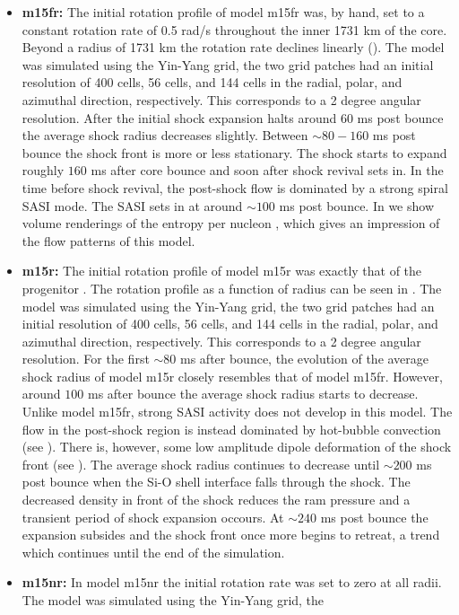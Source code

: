 \begin{itemize}
\item \textbf{m15fr:} The initial rotation profile of model m15fr was, by hand, set to a constant rotation rate of 0.5 rad/s
throughout the inner 1731 km of the core. Beyond a radius of 1731 km the rotation rate declines linearly (). 
The model was simulated using the 
Yin-Yang grid, the two grid patches had an initial resolution of 400 cells, 56 cells, and 144 cells in the radial, polar, and
azimuthal direction, respectively. This corresponds to a 2 degree angular resolution. 
After the initial shock expansion halts around $60$ ms post bounce the average shock radius decreases slightly.
Between $\sim 80 - 160$ ms post bounce the shock front is more or less stationary. 
The shock starts to expand roughly $160$ ms after core bounce and soon after shock revival sets in.
In the time before shock revival, the post-shock flow is dominated by a strong spiral SASI mode. The SASI sets in at around
$\sim 100$ ms post bounce. In we show volume renderings of the entropy per nucleon , which gives
an impression of the flow patterns of this model.
\item \textbf{m15r:} The initial rotation profile of model m15r was exactly that of the progenitor \citep{heger_05}.
The rotation profile as a function of radius can be seen in .  
The model was simulated using the Yin-Yang grid, the two grid patches had an initial resolution of 400 cells, 
56 cells, and 144 cells in the radial, polar, and azimuthal direction, respectively. This corresponds to a 2 degree angular resolution.
For the first $\sim 80$ ms after bounce, the evolution of the average shock radius of model m15r closely resembles that
of model m15fr. However, around $100$ ms after bounce the average shock radius starts to decrease. Unlike model m15fr, strong 
SASI activity does not develop in this model. The flow in the post-shock region is instead dominated by hot-bubble convection
(see ).
There is, however, some low amplitude dipole deformation of the shock front (see ).
The average shock radius continues to decrease until
$\sim 200$ ms post bounce when the Si-O shell interface falls through the shock. The decreased density in front of the shock reduces the 
ram pressure and a transient period of shock expansion occours. At $\sim 240$ ms post bounce the expansion subsides and
the shock front once more begins to retreat, a trend which continues until the end of the simulation.  
\item \textbf{m15nr:} In model m15nr the initial rotation rate was set to zero at all radii. The model was simulated using the Yin-Yang grid, the

\end{itemize}

